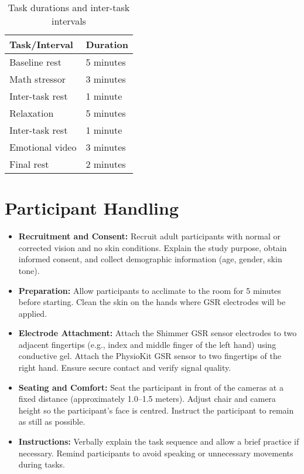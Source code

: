 \documentclass{article}
\begin{document}
\begin{table}[h]
    \centering
    \caption{Task durations and inter-task intervals}
    \begin{tabular}{ll}
        \hline
        Task/Interval   & Duration  \\
        \hline
        Baseline rest   & 5 minutes \\
        Math stressor   & 3 minutes \\
        Inter-task rest & 1 minute  \\
        Relaxation      & 5 minutes \\
        Inter-task rest & 1 minute  \\
        Emotional video & 3 minutes \\
        Final rest      & 2 minutes \\
        \hline
    \end{tabular}
\end{table}

\section{Participant Handling}

\begin{itemize}
    \item \textbf{Recruitment and Consent:} Recruit adult participants with normal or corrected vision and no skin conditions. Explain the study purpose, obtain informed consent, and collect demographic information (age, gender, skin tone).
    \item \textbf{Preparation:} Allow participants to acclimate to the room for 5 minutes before starting. Clean the skin on the hands where GSR electrodes will be applied.
    \item \textbf{Electrode Attachment:} Attach the Shimmer GSR sensor electrodes to two adjacent fingertips (e.g., index and middle finger of the left hand) using conductive gel. Attach the PhysioKit GSR sensor to two fingertips of the right hand. Ensure secure contact and verify signal quality.
    \item \textbf{Seating and Comfort:} Seat the participant in front of the cameras at a fixed distance (approximately 1.0–1.5 meters). Adjust chair and camera height so the participant's face is centred. Instruct the participant to remain as still as possible.
    \item \textbf{Instructions:} Verbally explain the task sequence and allow a brief practice if necessary. Remind participants to avoid speaking or unnecessary movements during tasks.
\end{itemize}
\end{document}
